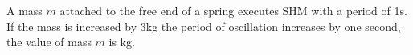 \item A mass \( m \) attached to the free end of a spring executes SHM with a period of 1s. If the mass is increased by 3kg the period of oscillation increases by one second, the value of mass \( m \) is \underline{\hspace{2.5cm}} kg.